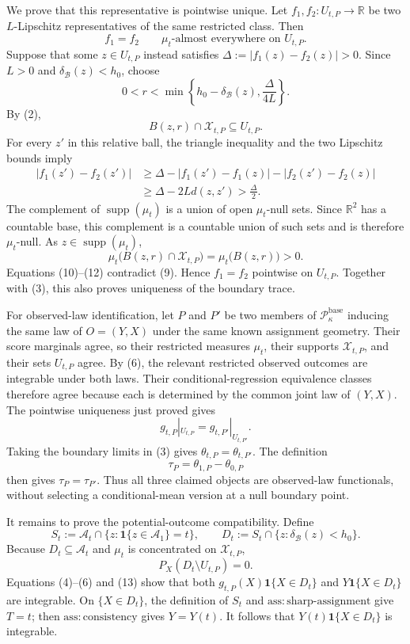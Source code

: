 We prove that this representative is pointwise unique. Let \(f_1,f_2:U_{t,P}\to\mathbb R\) be two \(L\)-Lipschitz representatives of the same restricted class. Then
\[
 f_1=f_2\qquad\mu_t\text{-almost everywhere on }U_{t,P}.
 \tag{9}
\]
Suppose that some \(z\in U_{t,P}\) instead satisfies \(\Delta:=|f_1(z)-f_2(z)|>0\). Since \(L>0\) and \(\delta_{\mathcal B}(z)<h_0\), choose
\[
 0<r<\min\left\{h_0-\delta_{\mathcal B}(z),\frac{\Delta}{4L}\right\}.
\]
By (2),
\[
 B(z,r)\cap\mathcal X_{t,P}\subseteq U_{t,P}.
 \tag{10}
\]
For every \(z'\) in this relative ball, the triangle inequality and the two Lipschitz bounds imply
\[
 \begin{aligned}
 |f_1(z')-f_2(z')|
 &\ge\Delta-|f_1(z')-f_1(z)|-|f_2(z')-f_2(z)|\\
 &\ge\Delta-2Ld(z,z')>\frac{\Delta}{2}.
 \end{aligned}
 \tag{11}
\]
The complement of \(\operatorname{supp}(\mu_t)\) is a union of open \(\mu_t\)-null sets. Since \(\mathbb R^2\) has a countable base, this complement is a countable union of such sets and is therefore \(\mu_t\)-null. As \(z\in\operatorname{supp}(\mu_t)\),
\[
 \mu_t\bigl(B(z,r)\cap\mathcal X_{t,P}\bigr)
 =\mu_t\bigl(B(z,r)\bigr)>0.
 \tag{12}
\]
Equations (10)--(12) contradict (9). Hence \(f_1=f_2\) pointwise on \(U_{t,P}\). Together with (3), this also proves uniqueness of the boundary trace.

For observed-law identification, let \(P\) and \(P'\) be two members of \(\mathcal P_{\kappa}^{\mathrm{base}}\) inducing the same law of \(O=(Y,X)\) under the same known assignment geometry. Their score marginals agree, so their restricted measures \(\mu_t\), their supports \(\mathcal X_{t,P}\), and their sets \(U_{t,P}\) agree. By (6), the relevant restricted observed outcomes are integrable under both laws. Their conditional-regression equivalence classes therefore agree because each is determined by the common joint law of \((Y,X)\). The pointwise uniqueness just proved gives
\[
 g_{t,P}|_{U_{t,P}}=g_{t,P'}|_{U_{t,P'}}.
\]
Taking the boundary limits in (3) gives \(\theta_{t,P}=\theta_{t,P'}\). The definition
\[
 \tau_P=\theta_{1,P}-\theta_{0,P}
\]
then gives \(\tau_P=\tau_{P'}\). Thus all three claimed objects are observed-law functionals, without selecting a conditional-mean version at a null boundary point.

It remains to prove the potential-outcome compatibility. Define
\[
 S_t:=\mathcal A_t\cap\{z:\mathbf 1\{z\in\mathcal A_1\}=t\},
 \qquad
 D_t:=S_t\cap\{z:\delta_{\mathcal B}(z)<h_0\}.
\]
Because \(D_t\subseteq\mathcal A_t\) and \(\mu_t\) is concentrated on \(\mathcal X_{t,P}\),
\[
 P_X(D_t\setminus U_{t,P})=0.
 \tag{13}
\]
Equations (4)--(6) and (13) show that both \(g_{t,P}(X)\mathbf 1\{X\in D_t\}\) and \(Y\mathbf 1\{X\in D_t\}\) are integrable. On \(\{X\in D_t\}\), the definition of \(S_t\) and \(\mathrm{ass:sharp\text{-}assignment}\) give \(T=t\); then \(\mathrm{ass:consistency}\) gives \(Y=Y(t)\). It follows that \(Y(t)\mathbf 1\{X\in D_t\}\) is integrable.

